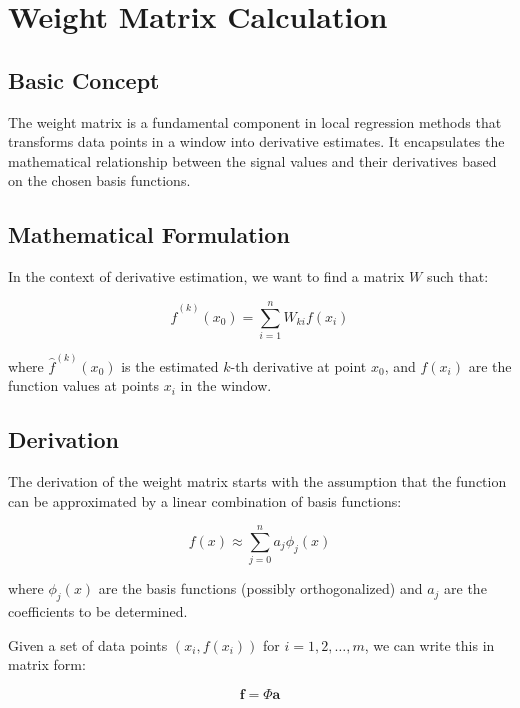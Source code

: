 \documentclass{article}
\begin{document}
\section{Weight Matrix Calculation}

\subsection{Basic Concept}

The weight matrix is a fundamental component in local regression methods that transforms data points in a window into derivative estimates. It encapsulates the mathematical relationship between the signal values and their derivatives based on the chosen basis functions.

\subsection{Mathematical Formulation}

In the context of derivative estimation, we want to find a matrix $W$ such that:

\begin{equation}
\hat{f}^{(k)}(x_0) = \sum_{i=1}^n W_{ki} f(x_i)
\end{equation}

where $\hat{f}^{(k)}(x_0)$ is the estimated $k$-th derivative at point $x_0$, and $f(x_i)$ are the function values at points $x_i$ in the window.

\subsection{Derivation}

The derivation of the weight matrix starts with the assumption that the function can be approximated by a linear combination of basis functions:

\begin{equation}
f(x) \approx \sum_{j=0}^n a_j \phi_j(x)
\end{equation}

where $\phi_j(x)$ are the basis functions (possibly orthogonalized) and $a_j$ are the coefficients to be determined.

Given a set of data points $(x_i, f(x_i))$ for $i = 1, 2, \ldots, m$, we can write this in matrix form:

\begin{equation}
\mathbf{f} = \Phi \mathbf{a}
\end{equation}
\end{document}
